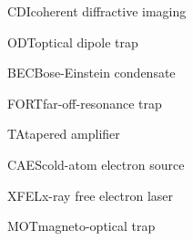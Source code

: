     {CDI}{coherent diffractive imaging}

    {ODT}{optical dipole trap}

    {BEC}{Bose-Einstein condensate}

    {FORT}{far-off-resonance trap}

    {TA}{tapered amplifier}

    {CAES}{cold-atom electron source}

    {XFEL}{x-ray free electron laser}

    {MOT}{magneto-optical trap}
